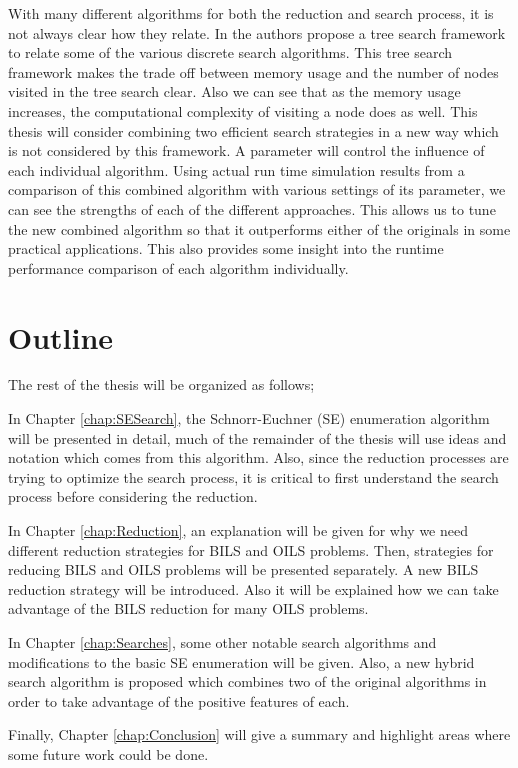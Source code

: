 \documentclass[12pt,Bold,letterpaper]{mcgilletdclass}
\newcommand{\vsp}{\vspace{\baselineskip}}
\begin{document}
With many different algorithms for both the reduction and search process, it is not always clear how they relate. In \cite{MurGDC06} the authors propose a tree search framework to relate some of the various discrete search algorithms. This tree search framework makes the trade off between memory usage and the number of nodes visited in the tree search clear. Also we can see that as the memory usage increases, the computational complexity of visiting a node does as well. This thesis will consider combining two efficient search strategies in a new way which is not considered by this framework. A parameter will control the influence of each individual algorithm. Using actual run time simulation results from a comparison of this combined algorithm with various settings of its parameter, we can see the strengths of each of the different approaches. This allows us to tune the new combined algorithm so that it outperforms either of the originals in some practical applications. This also provides some insight into the runtime performance comparison of each algorithm individually.

\vsp \section{Outline}
The rest of the thesis will be organized as follows;

In Chapter \ref{chap:SESearch}, the Schnorr-Euchner (SE) enumeration algorithm \cite{SchE94} will be presented in detail, much of the remainder of the thesis will use ideas and notation which comes from this algorithm. Also, since the reduction processes are trying to optimize the search process, it is critical to first understand the search process before considering the reduction.

In Chapter \ref{chap:Reduction}, an explanation will be given for why we need different reduction strategies for BILS and OILS problems. Then, strategies for reducing BILS and OILS problems will be presented separately. A new BILS reduction strategy will be introduced. Also it will be explained how we can take advantage of the BILS reduction for many OILS problems.

In Chapter \ref{chap:Searches}, some other notable search algorithms and modifications to the basic SE enumeration will be given. Also, a new hybrid search algorithm is proposed which combines two of the original algorithms in order to take advantage of the positive features of each.

Finally, Chapter \ref{chap:Conclusion} will give a summary and highlight areas where some future work could be done.
\end{document}
